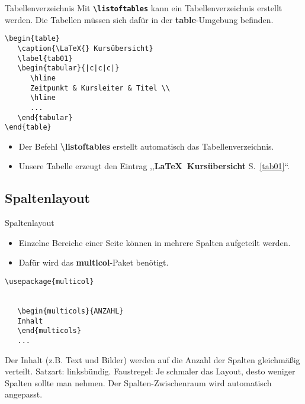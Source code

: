 \begin{frame}[fragile]{Tabellenverzeichnis}
Mit \textbf{\texttt{\textbackslash listoftables}} kann ein Tabellenverzeichnis erstellt werden.
Die Tabellen müssen sich dafür in der \textbf{table}-Umgebung befinden.

\begin{lstlisting}[style=tex]
\begin{table}
   \caption{\LaTeX{} Kursübersicht}
   \label{tab01}
   \begin{tabular}{|c|c|c|}
      \hline
      Zeitpunkt & Kursleiter & Titel \\
      \hline 
      ...   
   \end{tabular}
\end{table}
\end{lstlisting}\label{tab01}\pause

\begin{itemize}
\item Der Befehl \textbf{\textbackslash listoftables} erstellt automatisch das Tabellenverzeichnis.
\item Unsere Tabelle erzeugt den Eintrag ,,\textbf{\LaTeX{}~Kursübersicht} S.~\ref{tab01}``.
\end{itemize}
\end{frame}

\subsection{Spaltenlayout}
\begin{frame}[fragile]{Spaltenlayout}
\begin{itemize}
\item Einzelne Bereiche einer Seite können in mehrere Spalten aufgeteilt werden.
\item Dafür wird das \textbf{multicol}-Paket benötigt.
\end{itemize}

\begin{lstlisting}[style=tex]
\usepackage{multicol}


   \begin{multicols}{ANZAHL}
   Inhalt
   \end{multicols}
   ...

\end{lstlisting}

{\itshape
\begin{multicols}{3}
Der Inhalt (z.B. Text und Bilder) werden auf die Anzahl der Spalten gleichmäßig verteilt. Satzart: linksbündig. Faustregel: Je schmaler das Layout, desto weniger Spalten sollte man nehmen. Der Spalten-Zwischenraum wird automatisch angepasst.
\end{multicols}}
\end{frame}

